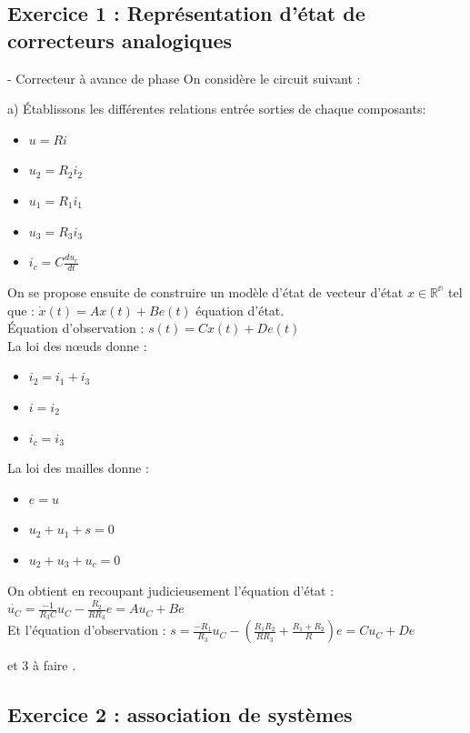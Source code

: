 \documentclass[../main.tex]{subfiles}
\begin{document}
\subsection*{Exercice 1 : Représentation d'état de correcteurs analogiques}

- Correcteur à avance de phase
On considère le circuit suivant :

\noindent a) Établissons les différentes relations entrée sorties de chaque composants:\\
\begin{itemize}
\item $u = Ri$
\item $u_2 = R_2i_2$
\item $ u_1 = R_1i_1$
\item $u_3 = R_3i_3$
\item $ i_c = C\frac{d u_c}{dt}$
\end{itemize}
\bigbreak

On se propose ensuite de construire un modèle d'état de vecteur d'état $x \in \mathbb{R^n}$ tel que : $\dot{x}(t)= Ax(t) + B e(t)$ équation d'état.\\
Équation d'observation : $s(t) = Cx(t) + De(t)$\\

La loi des nœuds donne :
\begin{itemize}
\item $ i_2 = i_1+i_3$
\item $ i = i_2$
\item $ i_c = i_3$
\end{itemize}
\bigbreak

La loi des mailles donne :
\begin{itemize}
\item $e = u$
\item $ u_2 + u_1 + s = 0$
\item $ u_2 + u_3 + u_c = 0$
\end{itemize}

On obtient en recoupant judicieusement l'équation d'état : \\
$ \dot{u_C} = \frac{-1}{R_3C}u_C - \frac{R_2}{RR_3}e = Au_C + B e$\\
Et l'équation d'observation : $s = \frac{-R_1}{R_3}u_C - (\frac{R_1R_2}{RR_3}+\frac{R_1+R_2}{R})e =  Cu_C + De$

 et 3 à faire .

\subsection*{Exercice 2 : association de systèmes}
\end{document}
